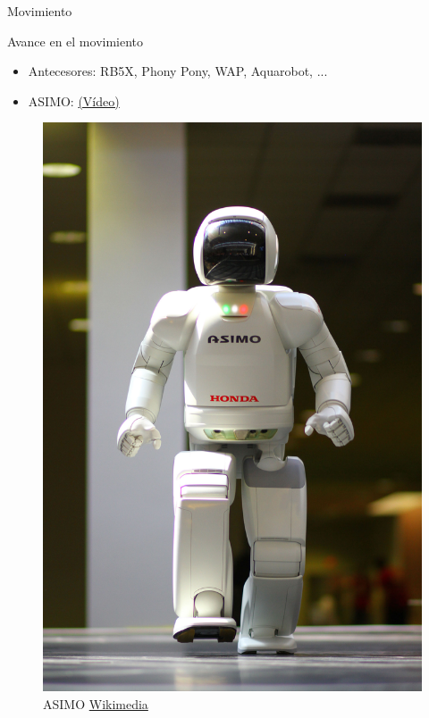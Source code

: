 \begin{frame}[fragile]{Movimiento}
\vspace{10px}
\pause
{}
\begin{block}{Avance en el movimiento}
	\begin{itemize}
		\item Antecesores: RB5X, Phony Pony, WAP, Aquarobot, ...
		\pause
		\item ASIMO: \href{https://www.youtube.com/watch?v=mI58DU1hu14}{(Vídeo)}
	\end{itemize}
\end{block}
\begin{figure}
	\centering
	\pause
	\includegraphics[scale=0.12]{./EtapaModerna/Imagenes/asimo.jpg}
	\caption{ASIMO \href{https://es.m.wikipedia.org/wiki/Archivo:ASIMO_4.28.11.jpg}{Wikimedia}}
\end{figure}
\end{frame}

